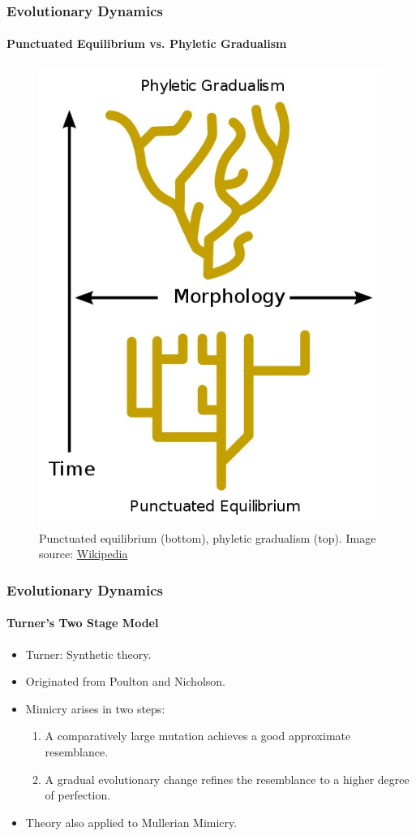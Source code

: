 \frame
{
	\frametitle{Evolutionary Dynamics}
	\framesubtitle{Punctuated Equilibrium vs. Phyletic Gradualism}

	\begin{figure}[H]
		\centering
		\includegraphics[scale=0.3]{../tex/images/Punctuated-equilibrium}
		\caption{Punctuated equilibrium (bottom), phyletic gradualism (top). Image source: \href{http://en.wikipedia.org/wiki/Punctuated_equilibrium}{Wikipedia}}
		\label{fig:punctuated-equilibrium}
	\end{figure}
}

\frame
{
	\frametitle{Evolutionary Dynamics}
	\framesubtitle{Turner's Two Stage Model}

	\begin{itemize}
		\item Turner: Synthetic theory.
		\item Originated from Poulton and Nicholson.
		\item Mimicry arises in two steps:
			\begin{enumerate}
				\item A comparatively large mutation achieves a good approximate resemblance.
				\item A gradual evolutionary change refines the resemblance to a higher degree of perfection.
			\end{enumerate}
		\item Theory also applied to Mullerian Mimicry.
	\end{itemize}
}

